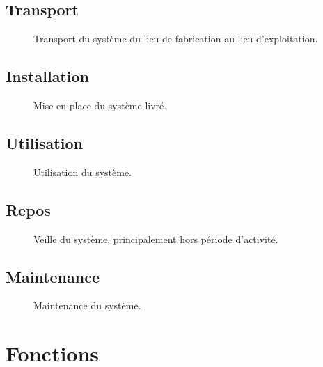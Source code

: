 \documentclass{article}
\begin{document}
\subsection{Transport}
\begin{figure}[hbt!]
	\centering
	
	\caption{
		Transport du système du lieu de fabrication au lieu d'exploitation.
	}
\end{figure}
\FloatBarrier

\newpage
\subsection{Installation}
\begin{figure}[hbt!]
	\centering
	
	\caption{Mise en place du système livré.}
\end{figure}
\FloatBarrier

\subsection{Utilisation}
\begin{figure}[hbt!]
	\centering
	
	\caption{Utilisation du système.}
\end{figure}
\FloatBarrier

\newpage
\subsection{Repos}
\begin{figure}[hbt!]
	\centering
	
	\caption{Veille du système, principalement hors période d'activité.}
\end{figure}
\FloatBarrier

\subsection{Maintenance}
\begin{figure}[hbt!]
	\centering
	
	\caption{Maintenance du système.}
\end{figure}
\FloatBarrier

\newpage
\section{Fonctions}
\end{document}
